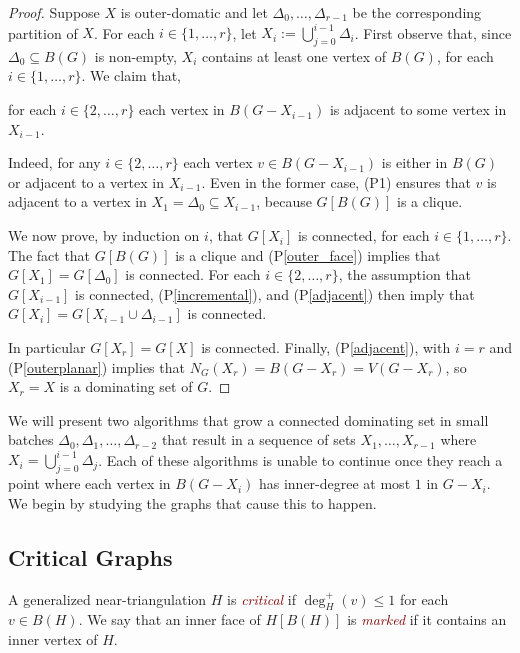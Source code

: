 \documentclass{article}
\newcommand{\pref}[1]{(P\ref{#1})}
\newcommand{\defin}[1]{\emph{\textcolor{Maroon}{#1}}}
\theoremstyle{definition}
\begin{document}
\begin{proof}
  Suppose $X$ is outer-domatic and let $\Delta_0,\ldots,\Delta_{r-1}$ be the corresponding partition of $X$.  For each $i\in\{1,\ldots,r\}$, let $X_i:=\bigcup_{j=0}^{i-1} \Delta_i$.  First observe that, since $\Delta_0\subseteq B(G)$ is non-empty, $X_i$ contains at least one vertex of $B(G)$, for each $i\in\{1,\ldots,r\}$. We claim that,
  \begin{compactenum}[(P1)]\setcounter{enumi}{3}
    \item for each $i\in\{2,\ldots,r\}$ each vertex in $B(G-X_{i-1})$ is adjacent to some vertex in $X_{i-1}$. \label{adjacent}
  \end{compactenum}
  Indeed, for any $i\in\{2,\ldots,r\}$ each vertex $v\in B(G-X_{i-1})$ is either in $B(G)$ or adjacent to a vertex in $X_{i-1}$. Even in the former case, (P1) ensures that $v$ is adjacent to a vertex in $X_1=\Delta_0\subseteq X_{i-1}$, because $G[B(G)]$ is a clique.

  We now prove, by induction on $i$, that $G[X_i]$ is connected, for each $i\in\{1,\ldots,r\}$.
  The fact that $G[B(G)]$ is a clique and \pref{outer_face} implies that $G[X_1]=G[\Delta_0]$ is connected. For each $i\in\{2,\ldots,r\}$, the assumption that $G[X_{i-1}]$ is connected, \pref{incremental}, and \pref{adjacent} then imply that $G[X_i]=G[X_{i-1}\cup\Delta_{i-1}]$ is connected.

  In particular $G[X_r]=G[X]$ is connected.  Finally, \pref{adjacent}, with $i=r$ and \pref{outerplanar} implies that $N_G(X_r)=B(G-X_r)=V(G-X_r)$, so $X_r=X$ is a dominating set of $G$.
\end{proof}

We will present two algorithms that grow a connected dominating set in small batches $\Delta_0,\Delta_1,\ldots,\Delta_{r-2}$ that result in a sequence of sets $X_1,\ldots,X_{r-1}$ where $X_{i}=\bigcup_{j=0}^{i-1}\Delta_j$.  Each of these algorithms is unable to continue once they reach a point where each vertex in $B(G-X_i)$ has inner-degree at most $1$ in $G-X_i$.  We begin by studying the graphs that cause this to happen.

\subsection{Critical Graphs}

A generalized near-triangulation $H$ is \defin{critical} if $\deg^+_H(v)\le 1$ for each $v\in B(H)$. We say that an inner face of $H[B(H)]$ is \defin{marked} if it contains an inner vertex of $H$.
\end{document}
